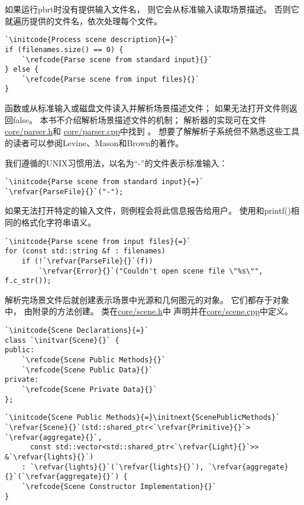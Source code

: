 如果运行pbrt时没有提供输入文件名，
则它会从标准输入读取场景描述。
否则它就遍历提供的文件名，依次处理每个文件。
\begin{lstlisting}
`\initcode{Process scene description}{=}`
if (filenames.size() == 0) {
    `\refcode{Parse scene from standard input}{}`
} else {
    `\refcode{Parse scene from input files}{}`
}
\end{lstlisting}
函数{}或从标准输入或磁盘文件读入并解析场景描述文件；
如果无法打开文件则返回{\ttfamily false}。
本书不介绍解析场景描述文件的机制；
解析器的实现可在文件\href{https://github.com/mmp/pbrt-v3/blob/master/src/core/parser.h}{\ttfamily core/parser.h}和
\href{https://github.com/mmp/pbrt-v3/blob/master/src/core/parser.cpp}{\ttfamily core/parser.cpp}中找到
。
想要了解解析子系统但不熟悉这些工具的读者可以参阅Levine、Mason和Brown的著作\citep{10.5555/136311}。

我们遵循的UNIX习惯用法，以名为“{\ttfamily -}”的文件表示标准输入：
\begin{lstlisting}
`\initcode{Parse scene from standard input}{=}`
`\refvar{ParseFile}{}`("-");
\end{lstlisting}

如果无法打开特定的输入文件，则例程会将此信息报告给用户。
使用和{\ttfamily printf()}相同的格式化字符串语义。
\begin{lstlisting}
`\initcode{Parse scene from input files}{=}`
for (const std::string &f : filenames)
    if (!`\refvar{ParseFile}{}`(f))
        `\refvar{Error}{}`("Couldn't open scene file \"%s\"", f.c_str());
\end{lstlisting}

解析完场景文件后就创建表示场景中光源和几何图元的对象。
它们都存于对象中，
由附录的方法创建。
类在\href{https://github.com/mmp/pbrt-v3/tree/master/src/core/scene.h}{\ttfamily core/scene.h}中
声明并在\href{https://github.com/mmp/pbrt-v3/tree/master/src/core/scene.cpp}{\ttfamily core/scene.cpp}中定义。
\begin{lstlisting}
`\initcode{Scene Declarations}{=}`
class `\initvar{Scene}{}` {
public:
    `\refcode{Scene Public Methods}{}`
    `\refcode{Scene Public Data}{}`
private:
    `\refcode{Scene Private Data}{}`
};
\end{lstlisting}

\begin{lstlisting}
`\initcode{Scene Public Methods}{=}\initnext{ScenePublicMethods}`
`\refvar{Scene}{}`(std::shared_ptr<`\refvar{Primitive}{}`> `\refvar{aggregate}{}`,
      const std::vector<std::shared_ptr<`\refvar{Light}{}`>> &`\refvar{lights}{}`)
    : `\refvar{lights}{}`(`\refvar{lights}{}`), `\refvar{aggregate}{}`(`\refvar{aggregate}{}`) {
    `\refcode{Scene Constructor Implementation}{}`
}
\end{lstlisting}

